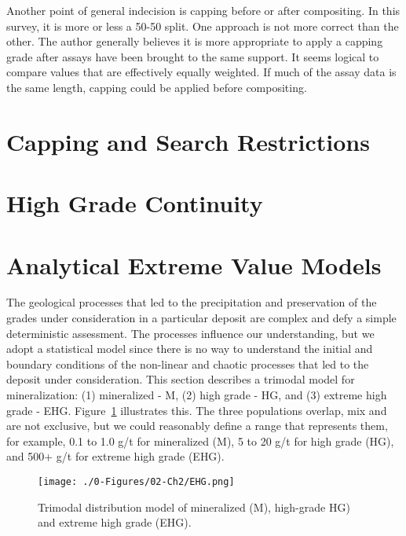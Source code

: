 Another point of general indecision is capping before or after compositing. In this survey, it is more or less a 50-50 split. One approach is not more correct than the other. The author generally believes it is more appropriate to apply a capping grade after assays have been brought to the same support. It seems logical to compare values that are effectively equally weighted. If much of the assay data is the same length, capping could be applied before compositing.

\FloatBarrier
\section{Capping and Search Restrictions}
\label{sec:capping}


\FloatBarrier
\section{High Grade Continuity}
\label{sec:continuity}


\FloatBarrier
\section{Analytical Extreme Value Models}
\label{sec:analytical}

The geological processes that led to the precipitation and preservation of the grades under consideration in a particular deposit are complex and defy a simple deterministic assessment. The processes influence our understanding, but we adopt a statistical model since there is no way to understand the initial and boundary conditions of the non-linear and chaotic processes that led to the deposit under consideration. This section describes a trimodal model for mineralization: (1) mineralized - M, (2) high grade - HG, and (3) extreme high grade - EHG. Figure~\ref{fig:ehg} illustrates this. The three populations overlap, mix and are not exclusive, but we could reasonably define a range that represents them, for example, 0.1 to 1.0 g/t for mineralized (M), 5 to 20 g/t for high grade (HG), and 500+ g/t for extreme high grade (EHG).

\begin{figure}[htb!]
    \centering
    \texttt{[image: ./0-Figures/02-Ch2/EHG.png]}
    \caption{Trimodal distribution model of mineralized (M), high-grade HG) and extreme high grade (EHG).}
    \label{fig:ehg}
\end{figure}


